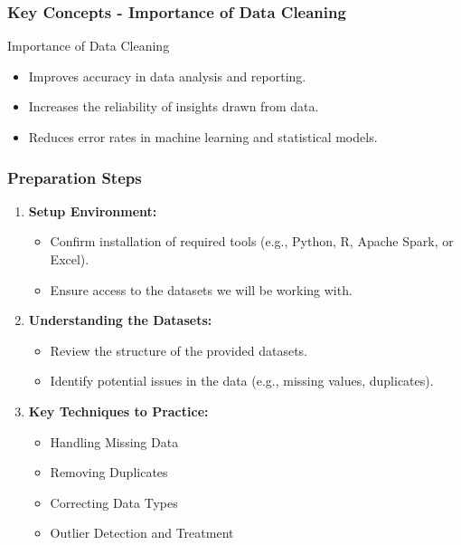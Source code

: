 \documentclass[aspectratio=169]{beamer}
\begin{document}
\begin{frame}[fragile]
    \frametitle{Key Concepts - Importance of Data Cleaning}
    \begin{block}{Importance of Data Cleaning}
        \begin{itemize}
            \item Improves accuracy in data analysis and reporting.
            \item Increases the reliability of insights drawn from data.
            \item Reduces error rates in machine learning and statistical models.
        \end{itemize}
    \end{block}
\end{frame}

\begin{frame}[fragile]
    \frametitle{Preparation Steps}
    \begin{enumerate}
        \item \textbf{Setup Environment:}
            \begin{itemize}
                \item Confirm installation of required tools (e.g., Python, R, Apache Spark, or Excel).
                \item Ensure access to the datasets we will be working with.
            \end{itemize}
        \item \textbf{Understanding the Datasets:}
            \begin{itemize}
                \item Review the structure of the provided datasets.
                \item Identify potential issues in the data (e.g., missing values, duplicates).
            \end{itemize}
        \item \textbf{Key Techniques to Practice:}
            \begin{itemize}
                \item Handling Missing Data
                \item Removing Duplicates
                \item Correcting Data Types
                \item Outlier Detection and Treatment
            \end{itemize}
    \end{enumerate}
\end{frame}
\end{document}
